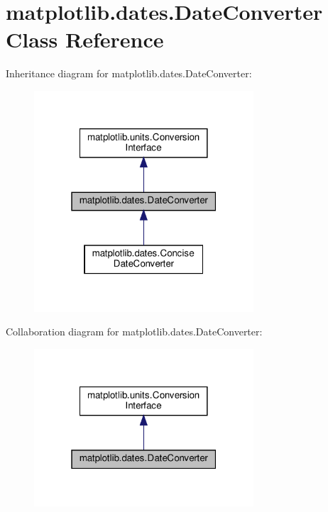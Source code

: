 \hypertarget{classmatplotlib_1_1dates_1_1DateConverter}{}\section{matplotlib.\+dates.\+Date\+Converter Class Reference}
\label{classmatplotlib_1_1dates_1_1DateConverter}


Inheritance diagram for matplotlib.\+dates.\+Date\+Converter\+:
\nopagebreak
\begin{figure}[H]
\begin{center}
\leavevmode
\includegraphics[width=232pt]{classmatplotlib_1_1dates_1_1DateConverter__inherit__graph}
\end{center}
\end{figure}


Collaboration diagram for matplotlib.\+dates.\+Date\+Converter\+:
\nopagebreak
\begin{figure}[H]
\begin{center}
\leavevmode
\includegraphics[width=232pt]{classmatplotlib_1_1dates_1_1DateConverter__coll__graph}
\end{center}
\end{figure}
